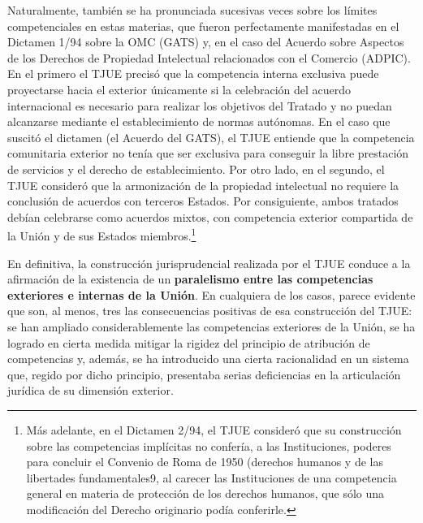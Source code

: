 \documentclass[10pt,a4paper]{article}
\begin{document}
Naturalmente, también se ha pronunciada sucesivas veces sobre los límites competenciales en estas materias, que fueron perfectamente manifestadas en el Dictamen 1/94 sobre la OMC (GATS) y, en el caso del Acuerdo sobre Aspectos de los Derechos de Propiedad Intelectual relacionados con el Comercio (ADPIC). En el primero el TJUE precisó que la competencia interna exclusiva puede proyectarse hacia el exterior únicamente si la celebración del acuerdo internacional es necesario para realizar los objetivos del Tratado y no puedan alcanzarse mediante el establecimiento de normas autónomas. En el caso que suscitó el dictamen (el Acuerdo del GATS), el TJUE entiende que la competencia comunitaria exterior no tenía que ser exclusiva para conseguir la libre prestación de servicios y el derecho de establecimiento. Por otro lado, en el segundo, el TJUE consideró que la armonización de la propiedad intelectual no requiere la conclusión de acuerdos con terceros Estados. Por consiguiente, ambos tratados debían celebrarse como acuerdos mixtos, con competencia exterior compartida de la Unión y de sus Estados miembros.\footnote{%
    Más adelante, en el Dictamen 2/94, el TJUE consideró que su construcción sobre las competencias implícitas no confería, a las Instituciones, poderes para concluir el Convenio de Roma de 1950 (derechos humanos y de las libertades fundamentales9, al carecer las Instituciones de una competencia general en materia de protección de los derechos humanos, que sólo una modificación del Derecho originario podía conferirle.
}

En definitiva, la construcción jurisprudencial realizada por el TJUE conduce a la afirmación de la existencia de un \textbf{paralelismo entre las competencias exteriores e internas de la Unión}. En cualquiera de los casos, parece evidente que son, al menos, tres las consecuencias positivas de esa construcción del TJUE: se han ampliado considerablemente las competencias exteriores de la Unión, se ha logrado en cierta medida mitigar la rigidez del principio de atribución de competencias y, además, se ha introducido una cierta racionalidad en un sistema que, regido por dicho principio, presentaba serias deficiencias en la articulación jurídica de su dimensión exterior.
\end{document}
